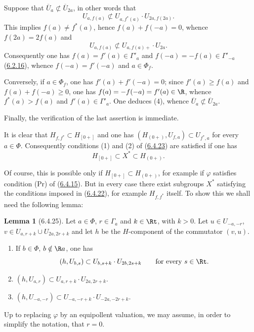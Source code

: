 \documentclass[12pt,a4paper,oneside,english]{smfart}
\makeatletter
\newcommand{\btanchor}[1]{\leavevmode\Hy@raisedlink{\hypertarget{bt:#1}{}}}
\newcommand{\btpageanchor}[1]{\Hy@raisedlink{\hypertarget{p:#1}{}}}
\newcommand{\btref}[1]{\hyperlink{bt:#1}{#1}}
\newcommand{\btpage}[1]{\marginnote{p.~#1}\btpageanchor{#1}}
\newcommand{\pmark}[1]{\btpage{#1}}
\theoremstyle{definition}
\theoremstyle{bt}
\newtheorem{lem}{Lemma}
\makeatother
\begin{document}
\pmark{143}
Suppose that $\overline{U}_a\not\subset\overline{U}_{2a}$, in other words
that
\begin{equation}
  U_{a,f(a)}\not\subset U_{a,f^{*}(a)}\cdot U_{2a,f(2a)}.
\end{equation}
This implies $f(a)\neq f^{*}(a)$, hence $f(a)+f(-a)=0$, whence
$f(2a)=2f(a)$ and
\[
  U_{a,f(a)}\not\subset U_{a,f(a)+}\cdot U_{2a}.
\]
Consequently one has $f(a)=f'(a)\in\Gamma'_a$ and
$f(-a)=-f(a)\in\Gamma'_{-a}$ (\btref{6.2.16}), whence $f(-a)=f'(-a)$ and
$a\in\Phi_f$.

Conversely, if $a\in\Phi_f$, one has $f'(a)+f'(-a)=0$; since
$f'(a)\geq f(a)$ and $f(a)+f(-a)\geq0$, one has
$f(a)=-f(-a)=f'(a)\in\R$, whence $f^{*}(a)>f(a)$ and $f'(a)\in\Gamma'_a$.
One deduces (4), whence
$\overline{U}_a\not\subset\overline{U}_{2a}$.

Finally, the verification of the last assertion is immediate.

\btanchor{6.4.24}
It is clear that $H_{f,f^{*}}\subset H_{[0+]}$ and one has
$(H_{(0+)},U_{f,a})\subset U_{f^{*},a}$ for every $a\in\Phi$. Consequently
conditions (1) and (2) of (\btref{6.4.23}) are satisfied if one has
\[
  H_{[0+]}\subset X^{*}\subset H_{(0+)}.
\]

Of course, this is possible only if $H_{[0+]}\subset H_{(0+)}$, for example
if $\varphi$ satisfies condition (Pr) of (\btref{6.4.15}). But in every case there
exist subgroups $X^{*}$ satisfying the conditions imposed in (\btref{6.4.22}), for
example $H_{f,f^{*}}$ itself. To show this we shall need the following
lemma:

\begin{lem}[6.4.25]\btanchor{6.4.25}
Let $a\in\Phi$, $r\in\Gamma_a$ and $k\in\Rt$, with $k>0$. Let
$u\in U_{-a,-r}$, $v\in U_{a,r+k}\cup U_{2a,2r+k}$ and let $h$ be the
$H$-component of the commutator $(v,u)$.
\begin{enumerate}[label=(\roman*),leftmargin=2.2em]
\item If $b\in\Phi$, $b\notin\R a$, one has
\[
  (h,U_{b,s})\subset U_{b,s+k}\cdot U_{2b,2s+k}\qquad\text{for every }s\in\Rt.
\]
\item $(h,U_{a,r})\subset U_{a,r+k}\cdot U_{2a,2r+k}$.
\item $(h,U_{-a,-r})\subset U_{-a,-r+k}\cdot U_{-2a,-2r+k}$.
\end{enumerate}
\end{lem}

Up to replacing $\varphi$ by an equipollent valuation, we may assume, in
order to simplify the notation, that $r=0$.
\end{document}
